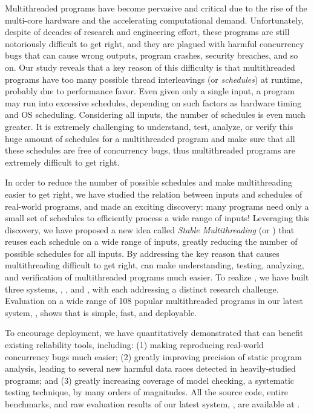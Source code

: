 Multithreaded programs have become pervasive and critical due to the rise of the
multi-core hardware and the accelerating computational demand.
Unfortunately, despite of decades of research and engineering effort, these
programs are still notoriously difficult to get right, and they are plagued with
harmful concurrency bugs that can cause wrong outputs, program crashes, security
breaches, and so on. Our study reveals that a key reason of this difficulty is
that multithreaded programs have too many possible thread interleavings (or
\emph{schedules}) at runtime, probably due to performance favor. Even given only a
single input, a program may run into excessive schedules, depending on such
factors as hardware timing and OS scheduling. Considering all inputs, the number
of schedules is even much greater. It is extremely challenging to understand,
test, analyze, or verify this huge amount of schedules for a
multithreaded program and make sure that all these schedules are free of concurrency
bugs, thus multithreaded programs are extremely difficult to get right.

In order to reduce the number of possible schedules and make multithreading
easier to get right, we have studied the
relation between inputs and schedules of real-world programs, and made an
exciting discovery: many programs need only a small set of schedules to
efficiently process a wide range of inputs! Leveraging this discovery, we have
proposed a new idea called \emph{Stable Multithreading} (or \emph{\smt}) that reuses each
schedule on a wide range of inputs, greatly reducing the number of possible
schedules for all inputs. By addressing the key reason that causes multithreading
difficult to get right, \smt can make understanding,
testing, analyzing, and verification of multithreaded programs much
easier. To realize \smt, we have built three \smt systems, \tern,
\peregrine, and \parrot, with each addressing a distinct research challenge.
Evaluation on a wide range of 108 popular multithreaded programs in
our latest \smt system, \parrot, shows that \smt is simple, fast, and
deployable.

To encourage \smt deployment, we have quantitatively demonstrated that \smt 
can benefit existing reliability tools, including: (1) making reproducing
real-world concurrency bugs much easier;  (2) greatly improving precision of
static program analysis, leading to several new harmful data races detected in
heavily-studied programs; and (3) greatly increasing coverage of model checking,
a systematic testing technique, by many orders of magnitudes. All the source
code, entire benchmarks, and raw evaluation results of our latest \smt system,
\parrot, are available at \github.

